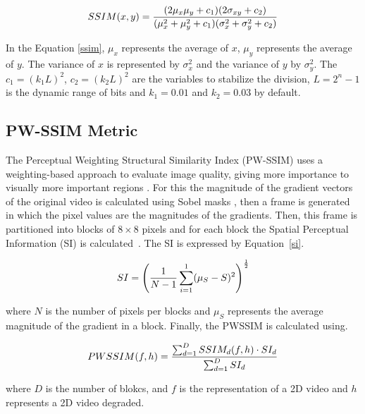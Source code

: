 \documentclass[journal]{IEEEtran}
\begin{document}
\begin{equation}
\label{ssim}
\centering
SSIM(x, y) = \frac{(2\mu _{x}\mu _{y} + c _{1})(2\sigma _{xy}+c _{2})}{(\mu_{x}^{2}+\mu_{y}^{2}+ c_{1})(\sigma _{x}^{2}+\sigma _{y}^{2}+c _{2})}
\end{equation}



In the Equation \ref{ssim},  $\mu_{x}$ represents the average of $x$,  $\mu_{y}$ represents the average of $y$. The variance of $x$ is represented by $\sigma _{x}^{2}$ and the variance of $y$ by $\sigma _{y}^{2}$. The $c_{1}=(k_{1}L)^{2}$, $c_{2}=(k_{2}L)^{2}$ are the variables to stabilize the division, $L = 2^{n} - 1$ is the dynamic range of bits and $k_{1}=0.01$ and $k_{2}=0.03$ by default.



\subsection{PW-SSIM Metric}

The Perceptual Weighting Structural Similarity Index (PW-SSIM) uses a weighting-based approach to evaluate image quality, giving more importance to visually more important regions \cite{danilo:15a}. For this the magnitude of the gradient vectors of the original video is calculated using Sobel masks \cite{furnari:15}, then a frame is generated in which the pixel values are the magnitudes of the gradients. Then, this frame is partitioned into blocks of $8 \times 8$ pixels and for each block the Spatial Perceptual Information (SI) is calculated~\cite{jean:15}. The SI is expressed by Equation~\ref{si}.

\begin{equation}
	\centering
	\label{si}
	SI = \left ( \frac{1}{N-1}\sum_{i=1}^{1}(\mu_{S}-S)^{2} \right )^{\frac{1}{2}}
\end{equation}

\noindent where $N$ is the number of pixels per blocks and $\mu_{S}$ represents the average magnitude of the gradient in a block. Finally, the PWSSIM is calculated using.

\begin{equation}
	\centering
	\label{pwssim}
	PWSSIM(f,h)= \frac{\sum_{d=1}^{D}SSIM_{d}(f,h)\cdot SI_{d}}{\sum_{d=1}^{D}SI_{d}}		
\end{equation}

\noindent  where $D$ is the number of blokcs, and $f$ is the representation of a 2D video and $h$ represents a 2D video degraded.
\end{document}
